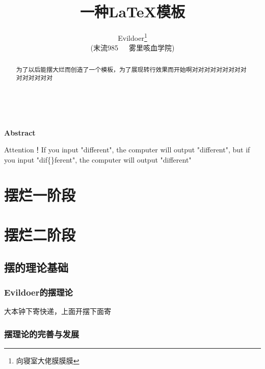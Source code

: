 \documentclass[12pt,a4paper]{article}%
\title{\fontsize{18pt}{27pt}\selectfont%
	{\heiti%
		一种\LaTeX 模板}}%
\author{\fontsize{12pt}{18pt}\selectfont%
	{\fangsong%
		Evildoer}\thanks{向寝室大佬膜膜膜}\\%
	\fontsize{10.5pt}{15.75pt}\selectfont%
	{\fangsong%
		(末流985~~~雾里咳血学院)}}%
\date{}%
\begin{document}
	\maketitle%
	\lhead{}%
	\chead{}%
	\rhead{}%
	\lfoot{}%
	\cfoot{\thepage}%
	\rfoot{}%
	\begin{abstract}
		\fangsong 为了以后能摆大烂而创造了一个模板，为了展现转行效果而开始啊对对对对对对对对对对对对对对对
	\end{abstract}
	
	\begin{adjustwidth}{1.06cm}{1.06cm}
		\fontsize{10.5pt}{15.75pt}\\
	\end{adjustwidth}
	
	\begin{center}%
		{\textbf{Abstract}}%
	\end{center}
	\begin{adjustwidth}{1.06cm}{1.06cm}%
		\hspace{1.5em}Attention！If you input "dif{}ferent", the computer will output "different", but if you input "dif\{\}ferent", the computer will output "dif{}ferent"
	\end{adjustwidth}
	\newpage%

\section{摆烂一阶段}
	
\section{摆烂二阶段}
\subsection{摆的理论基础}
    \subsubsection{Evildoer的摆理论}
    大本钟下寄快递，上面开摆下面寄
    \subsubsection{摆理论的完善与发展}
\end{document}
